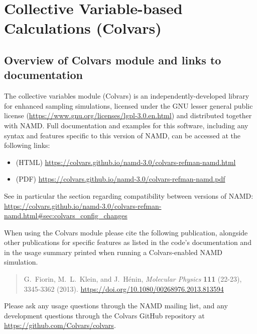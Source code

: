 \section{Collective Variable-based Calculations (Colvars)}
\label{section:colvars}

\subsection{Overview of Colvars module and links to documentation}

The collective variables module (Colvars) is an independently-developed library for enhanced sampling simulations, licensed under the GNU lesser general public license (\url{https://www.gnu.org/licenses/lgpl-3.0.en.html}) and distributed together with NAMD.
Full documentation and examples for this software, including any syntax and features specific to this version of NAMD, can be accessed at the following links:
\begin{itemize}
\item (HTML) \url{https://colvars.github.io/namd-3.0/colvars-refman-namd.html}
\item (PDF) \url{https://colvars.github.io/namd-3.0/colvars-refman-namd.pdf}
\end{itemize}
\noindent{}See in particular the section regarding compatibility between versions of NAMD:\\
\url{https://colvars.github.io/namd-3.0/colvars-refman-namd.html#sec:colvars_config_changes}

When using the Colvars module please cite the following publication, alongside other publications for specific features as listed in the code's documentation and in the usage summary printed when running a Colvars-enabled NAMD simulation.

\begin{quote}
  G.\ Fiorin, M.\ L.\ Klein, and J.\ H\'enin, {\it Molecular Physics} {\bf 111} (22-23), 3345-3362 (2013). \url{https://doi.org/10.1080/00268976.2013.813594}
\end{quote}

Please ask any usage questions through the NAMD mailing list, and any development questions through the Colvars GitHub repository at \url{https://github.com/Colvars/colvars}.
